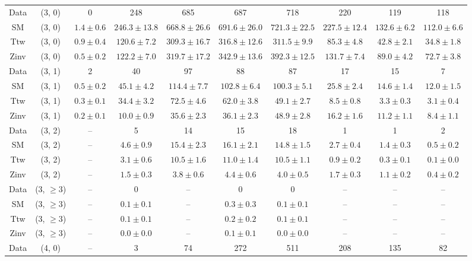 \begin{table}[h!]
{\begin{tabular}{cccccccccc}
	Data & (3, 0) & 0 & 248 & 685 & 687 & 718 & 220 & 119 & 118 \\[0.5ex] 
	SM & (3, 0) & $1.4\pm 0.6$ & $246.3\pm 13.8$ & $668.8\pm 26.6$ & $691.6\pm 26.0$ & $721.3\pm 22.5$ & $227.5\pm 12.4$ & $132.6\pm 6.2$ & $112.0\pm 6.6$ \\[0.5ex] 
	Ttw & (3, 0) & $0.9\pm 0.4$ & $120.6\pm 7.2$ & $309.3\pm 16.7$ & $316.8\pm 12.6$ & $311.5\pm 9.9$ & $85.3\pm 4.8$ & $42.8\pm 2.1$ & $34.8\pm 1.8$ \\[0.5ex] 
	Zinv & (3, 0) & $0.5\pm 0.2$ & $122.2\pm 7.0$ & $319.7\pm 17.2$ & $342.9\pm 13.6$ & $392.3\pm 12.5$ & $131.7\pm 7.4$ & $89.0\pm 4.2$ & $72.7\pm 3.8$ \\[0.5ex] 
	Data & (3, 1) & 2 & 40 & 97 & 88 & 87 & 17 & 15 & 7 \\[0.5ex] 
	SM & (3, 1) & $0.5\pm 0.2$ & $45.1\pm 4.2$ & $114.4\pm 7.7$ & $102.8\pm 6.4$ & $100.3\pm 5.1$ & $25.8\pm 2.4$ & $14.6\pm 1.4$ & $12.0\pm 1.5$ \\[0.5ex] 
	Ttw & (3, 1) & $0.3\pm 0.1$ & $34.4\pm 3.2$ & $72.5\pm 4.6$ & $62.0\pm 3.8$ & $49.1\pm 2.7$ & $8.5\pm 0.8$ & $3.3\pm 0.3$ & $3.1\pm 0.4$ \\[0.5ex] 
	Zinv & (3, 1) & $0.2\pm 0.1$ & $10.0\pm 0.9$ & $35.6\pm 2.3$ & $36.1\pm 2.3$ & $48.9\pm 2.8$ & $16.2\pm 1.6$ & $11.2\pm 1.1$ & $8.4\pm 1.1$ \\[0.5ex] 
	Data & (3, 2) & -- & 5 & 14 & 15 & 18 & 1 & 1 & 2 \\[0.5ex] 
	SM & (3, 2) & -- & $4.6\pm 0.9$ & $15.4\pm 2.3$ & $16.1\pm 2.1$ & $14.8\pm 1.5$ & $2.7\pm 0.4$ & $1.4\pm 0.3$ & $0.5\pm 0.2$ \\[0.5ex] 
	Ttw & (3, 2) & -- & $3.1\pm 0.6$ & $10.5\pm 1.6$ & $11.0\pm 1.4$ & $10.5\pm 1.1$ & $0.9\pm 0.2$ & $0.3\pm 0.1$ & $0.1\pm 0.0$ \\[0.5ex] 
	Zinv & (3, 2) & -- & $1.5\pm 0.3$ & $3.8\pm 0.6$ & $4.4\pm 0.6$ & $4.0\pm 0.5$ & $1.7\pm 0.3$ & $1.1\pm 0.2$ & $0.4\pm 0.2$ \\[0.5ex] 
	Data & (3, $\ge3$) & -- & 0 & -- & 0 & 0 & -- & -- & -- \\[0.5ex] 
	SM & (3, $\ge3$) & -- & $0.1\pm 0.1$ & -- & $0.3\pm 0.3$ & $0.1\pm 0.1$ & -- & -- & -- \\[0.5ex] 
	Ttw & (3, $\ge3$) & -- & $0.1\pm 0.1$ & -- & $0.2\pm 0.2$ & $0.1\pm 0.1$ & -- & -- & -- \\[0.5ex] 
	Zinv & (3, $\ge3$) & -- & $0.0\pm 0.0$ & -- & $0.1\pm 0.1$ & $0.0\pm 0.0$ & -- & -- & -- \\[0.5ex] 
	Data & (4, 0) & -- & 3 & 74 & 272 & 511 & 208 & 135 & 82 \\[0.5ex] 

\end{tabular}}
\end{table}
